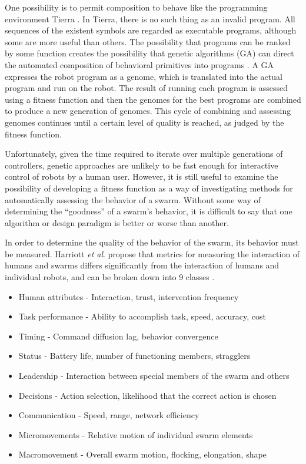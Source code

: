 One possibility is to permit composition to behave like the programming environment Tierra \citep{ray1991approach}.
In Tierra, there is no such thing as an invalid program. 
All sequences of the existent symbols are regarded as executable programs, although some are more useful than others. 
The possibility that programs can be ranked by some function creates the possibility that genetic algorithms (GA) can direct the automated composition of behavioral primitives into programs \citep{palmer2005emergence}.
A GA expresses the robot program as a genome, which is translated into the actual program and run on the robot. 
The result of running each program is assessed using a fitness function and then the genomes for the best programs are combined to produce a new generation of genomes. 
This cycle of combining and assessing genomes continues until a certain level of quality is reached, as judged by the fitness function.

Unfortunately, given the time required to iterate over multiple generations of controllers, genetic approaches are unlikely to be fast enough for interactive control of robots by a human user. 
However, it is still useful to examine the possibility of developing a fitness function as a way of investigating methods for automatically assessing the behavior of a swarm.
Without some way of determining the ``goodness'' of a swarm's behavior, it is difficult to say that one algorithm or design paradigm is better or worse than another. 

In order to determine the quality of the behavior of the swarm, its behavior must be measured.
Harriott \emph{et al}. propose that metrics for measuring the interaction of humans and swarms differs significantly from the interaction of humans and individual robots, and can be broken down into 9 classes \citep{harriott2014biologically}. 
\begin{itemize}[noitemsep]
\item Human attributes - Interaction, trust, intervention frequency 
\item Task performance - Ability to accomplish task, speed, accuracy, cost
\item Timing - Command diffusion lag, behavior convergence
\item Status - Battery life, number of functioning members, stragglers
\item Leadership - Interaction between special members of the swarm and others
\item Decisions - Action selection, likelihood that the correct action is chosen
\item Communication - Speed, range, network efficiency
\item Micromovements - Relative motion of individual swarm elements
\item Macromovement - Overall swarm motion, flocking, elongation, shape 
\end{itemize}

